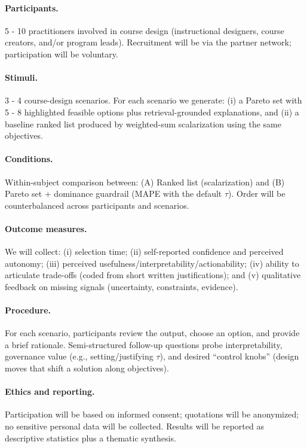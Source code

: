 \documentclass[sigconf,review]{acmart}
\newcommand{\MAPE}{\textsc{MAPE}\xspace}
\begin{document}
\paragraph{Participants.} 5 - 10 practitioners involved in course design (instructional designers, course creators, and/or program leads). Recruitment will be via the partner network; participation will be voluntary.

\paragraph{Stimuli.} 3 - 4 course-design scenarios. For each scenario we generate: (i) a Pareto set with 5 - 8 highlighted feasible options plus retrieval-grounded explanations, and (ii) a baseline ranked list produced by weighted-sum scalarization using the same objectives.

\paragraph{Conditions.} Within-subject comparison between:
(A) {Ranked list (scalarization)} and
(B) {Pareto set + dominance guardrail} (\MAPE with the default $\tau$).
Order will be counterbalanced across participants and scenarios.

\paragraph{Outcome measures.} We will collect:
(i) selection time; (ii) self-reported confidence and perceived autonomy; (iii) perceived usefulness/interpretability/actionability; (iv) ability to articulate trade-offs (coded from short written justifications); and (v) qualitative feedback on missing signals (uncertainty, constraints, evidence).

\paragraph{Procedure.} For each scenario, participants review the output, choose an option, and provide a brief rationale. Semi-structured follow-up questions probe interpretability, governance value (e.g., setting/justifying $\tau$), and desired ``control knobs'' (design moves that shift a solution along objectives).

\paragraph{Ethics and reporting.} Participation will be based on informed consent; quotations will be anonymized; no sensitive personal data will be collected. Results will be reported as descriptive statistics plus a thematic synthesis.
\end{document}
